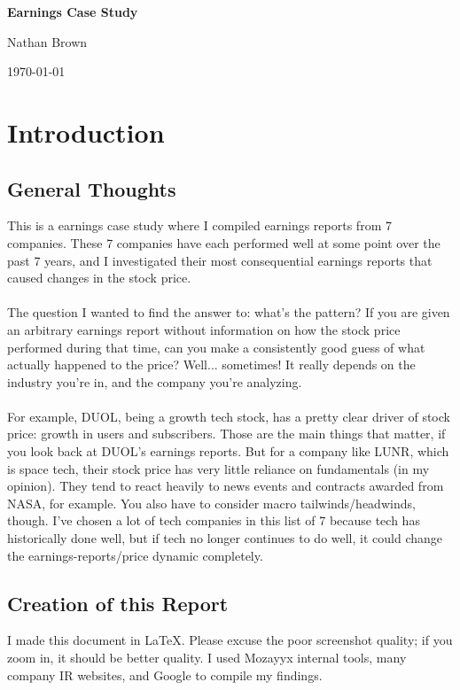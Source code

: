 \documentclass[11pt]{article}
\begin{document}
\begin{center}
    \vspace*{0.5cm}
    {\Huge\bfseries Earnings Case Study\par}
    \vspace{0.8cm}
    {\large Nathan Brown\par}
    {\large \today\par}
    \vspace{1cm}
\end{center}

\tableofcontents

\section{Introduction}
    \subsection{General Thoughts}
        This is a earnings case study where I compiled earnings reports from 7 companies. These 7 companies have each performed well at some point over the past 7 years, and I investigated their most consequential earnings reports that caused changes in the stock price. \\\\
        The question I wanted to find the answer to: what's the pattern? If you are given an arbitrary earnings report without information on how the stock price performed during that time, can you make a consistently good guess of what actually happened to the price? Well... sometimes! It really depends on the industry you're in, and the company you're analyzing. \\\\
        For example, DUOL, being a growth tech stock, has a pretty clear driver of stock price: growth in users and subscribers. Those are the main things that matter, if you look back at DUOL's earnings reports. But for a company like LUNR, which is space tech, their stock price has very little reliance on fundamentals (in my opinion). They tend to react heavily to news events and contracts awarded from NASA, for example. You also have to consider macro tailwinds/headwinds, though. I've chosen a lot of tech companies in this list of 7 because tech has historically done well, but if tech no longer continues to do well, it could change the earnings-reports/price dynamic completely.
    \subsection{Creation of this Report}
        I made this document in LaTeX. Please excuse the poor screenshot quality; if you zoom in, it should be better quality. I used Mozayyx internal tools, many company IR websites, and Google to compile my findings.\\\\
\end{document}
